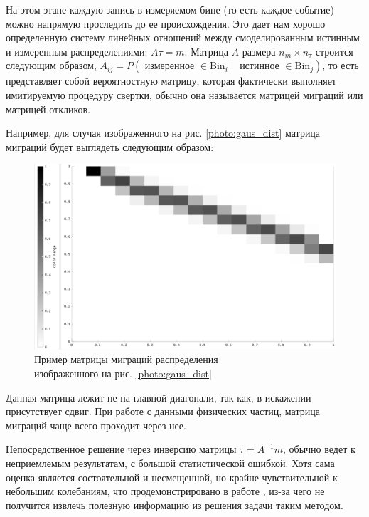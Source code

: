 \documentclass[a4paper,12pt]{diplom}
\begin{document}
На этом этапе каждую запись в измеряемом бине (то есть каждое событие) можно напрямую проследить до ее происхождения. 
Это дает нам хорошо определенную систему линейных отношений между смоделированным истинным и измеренным распределениями: 
$A\tau = m$. Матрица $A$ размера $n_{m} \times n_{\tau}$ строится следующим образом, 
$A_{ij} = P( \text{ измеренное } \in \text{Bin}_{i} \mid \text{ истинное } \in \text{Bin}_{j} )$, 
то есть представляет собой вероятностную матрицу, которая фактически выполняет имитируемую процедуру свертки, обычно она называется матрицей
миграций или матрицей откликов.

Например, для случая изображенного на рис. \eqref{photo:gaus_dist} матрица миграций будет выглядеть следующим образом:

\begin{figure}[!ht]
   \includegraphics[width=\linewidth]{images/gaus_mig_black.png}
   \caption{Пример матрицы миграций распределения \\ изображенного на рис. \eqref{photo:gaus_dist} }
   \label{photo:gaus_mig}
\end{figure}

Данная матрица лежит не на главной диагонали, так как, в искажении присутствует сдвиг. При работе с данными физических частиц, 
матрица миграций чаще всего проходит через нее.

Непосредственное решение через инверсию матрицы $\tau = A^{-1} m$, обычно ведет к неприемлемым результатам, с большой статистической
ошибкой. Хотя сама оценка является состоятельной и несмещенной, но крайне чувствительной к небольшим колебаниям, что продемонстрировано 
в работе \cite{SvdHocker}, из-за чего не получится извлечь полезную информацию из решения задачи таким методом.
\end{document}
